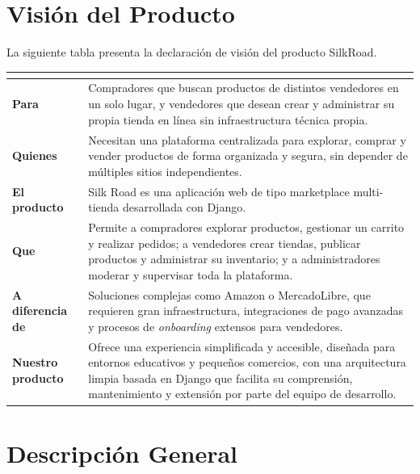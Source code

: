 \documentclass[12pt, letterpaper]{article}
\begin{document}
\newpage
\section{Visión del Producto}

La siguiente tabla presenta la declaración de visión del producto SilkRoad.

\vspace{8pt}
\begin{tabularx}{\linewidth}{>{\bfseries\color{primary}}p{3.2cm}X}
  \toprule
  \rowcolor{headerbg}
  \multicolumn{2}{l}{\textcolor{white}{\textbf{Silk Road — Declaración de Visión}}} \\
  \midrule
  Para
    & Compradores que buscan productos de distintos vendedores en un solo lugar, y
      vendedores que desean crear y administrar su propia tienda en línea sin
      infraestructura técnica propia. \\
  \rowcolor{rowalt}
  Quienes
    & Necesitan una plataforma centralizada para explorar, comprar y vender productos
      de forma organizada y segura, sin depender de múltiples sitios independientes. \\
  El producto
    & Silk Road es una aplicación web de tipo marketplace multi-tienda
      desarrollada con Django. \\
  \rowcolor{rowalt}
  Que
    & Permite a compradores explorar productos, gestionar un carrito y realizar
      pedidos; a vendedores crear tiendas, publicar productos y administrar su
      inventario; y a administradores moderar y supervisar toda la plataforma. \\
  A diferencia de
    & Soluciones complejas como Amazon o MercadoLibre, que requieren gran
      infraestructura, integraciones de pago avanzadas y procesos de \emph{onboarding}
      extensos para vendedores. \\
  \rowcolor{rowalt}
  Nuestro producto
    & Ofrece una experiencia simplificada y accesible, diseñada para entornos
      educativos y pequeños comercios, con una arquitectura limpia basada en Django
      que facilita su comprensión, mantenimiento y extensión por parte del equipo
      de desarrollo. \\
  \bottomrule
\end{tabularx}

\section{Descripción General}
\end{document}

